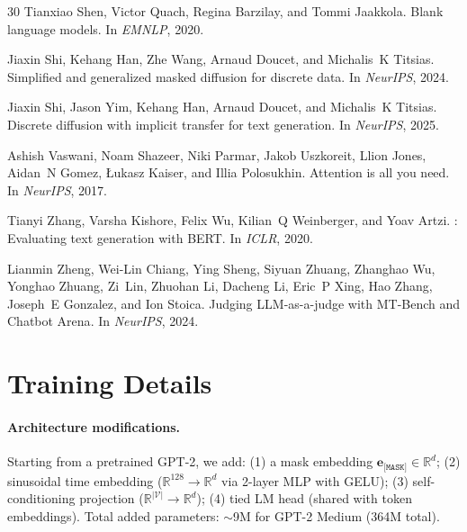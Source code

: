 \documentclass{article}
\newcommand{\mask}{\texttt{[MASK]}}
\newcommand{\R}{\mathbb{R}}
\newcommand{\V}{\mathcal{V}}
\begin{document}
\begin{thebibliography}{30}
Tianxiao Shen, Victor Quach, Regina Barzilay, and Tommi Jaakkola.
\newblock Blank language models.
\newblock In \emph{EMNLP}, 2020.

Jiaxin Shi, Kehang Han, Zhe Wang, Arnaud Doucet, and Michalis~K Titsias.
\newblock Simplified and generalized masked diffusion for discrete data.
\newblock In \emph{NeurIPS}, 2024.

Jiaxin Shi, Jason Yim, Kehang Han, Arnaud Doucet, and Michalis~K Titsias.
\newblock Discrete diffusion with implicit transfer for text generation.
\newblock In \emph{NeurIPS}, 2025.

Ashish Vaswani, Noam Shazeer, Niki Parmar, Jakob Uszkoreit, Llion Jones, Aidan~N Gomez, {\L}ukasz Kaiser, and Illia Polosukhin.
\newblock Attention is all you need.
\newblock In \emph{NeurIPS}, 2017.

Tianyi Zhang, Varsha Kishore, Felix Wu, Kilian~Q Weinberger, and Yoav Artzi.
: Evaluating text generation with {BERT}.
\newblock In \emph{ICLR}, 2020.

Lianmin Zheng, Wei-Lin Chiang, Ying Sheng, Siyuan Zhuang, Zhanghao Wu, Yonghao Zhuang, Zi~Lin, Zhuohan Li, Dacheng Li, Eric~P Xing, Hao Zhang, Joseph~E Gonzalez, and Ion Stoica.
\newblock Judging {LLM}-as-a-judge with {MT-Bench} and {Chatbot Arena}.
\newblock In \emph{NeurIPS}, 2024.

\end{thebibliography}

\newpage
\appendix

\section{Training Details}
\label{app:training}

\paragraph{Architecture modifications.}
Starting from a pretrained GPT-2, we add: (1) a mask embedding $\mathbf{e}_{\mask} \in \R^d$; (2) sinusoidal time embedding ($\R^{128} \to \R^d$ via 2-layer MLP with GELU); (3) self-conditioning projection ($\R^{|\V|} \to \R^d$); (4) tied LM head (shared with token embeddings).
Total added parameters: ${\sim}$9M for GPT-2 Medium (364M total).
\end{document}
